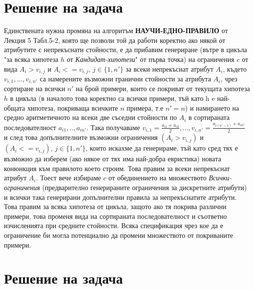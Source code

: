 \documentclass[12pt]{article}
\begin{document}
	
	
	\tableofcontents
	
	
	
	\newpage
	
	\section{Решение на задача }
	
	Единствената нужна промяна на алгоритъм \textbf{НАУЧИ-ЕДНО-ПРАВИЛО} от Лекция 5 Табл.5-2, която ще позволи той да работи коректно ако някой от атрибутите с непрекъснати стойности, е да прибавим генериране (вътре в цикъла "за всяка хипотеза $h$ от \textit{Кандидат-хипотези}" от първа точка) на ограничения $c$ от вида $A_{i} > v_{i,j}$ и $A_{i} <= v_{i,j}$, $j \in \{1, n'\}$ за всеки непрекъснат атрибут $A_{i}$, където $v_{i,1},...,v_{i,n'}$ са намерените възможни гранични стойности за атрибута $A_i$, чрез сортиране на всички $n'$ на брой примери, които се покриват от текущата хипотеза $h$ в цикъла (в началото това коректно са всички примери, тъй като h e най-общата хипотеза, покриваща всичките $n$ примера, т.е $n' = n$) и намирането на средно аритметичното на всеки две съседни стойности по $A_{i}$ в сортираната последователност $a_{i1},..,a_{in'}$. 
	\newline\newline Така получаваме $v_{i,1} = \frac{a_{i1}+a_{i2}}{2},...,v_{i,n'} = \frac{a_{i(n'-1)}+a_{in'}}{2}$ и след това допълнителните възможни ограничения $(A_{i} > v_{i,j})$ и $(A_{i} <= v_{i,j})$, $j \in \{1, n'\}$, които искахме да генерираме, тъй като сред тях е възможно да изберем (ако някое от тях има най-добра евристика) новата конюнкция към правилото което строим.
	Това правим за всеки непрекъснат атрибут $A_{i}$. Тоест вече избираме $c$ от обединението на множеството \textit{Всички-ограничения} (предварително генерираните ограничения за дискретните атрибути) и всички така генерирани допълнителни правила за непрекъснатите атрибути.  Това правим за всяка хипотеза от цикъла, защото ако тя покрива различни примери, това променя вида на сортираната последователност и съответно изчисленията при средните стойности. Всяка спецификация чрез кое да е ограничение би могла потенциално да промени множеството от покриваните примери.
	

	\newpage
	
	\section{Решение на задача }
	
\end{document}
